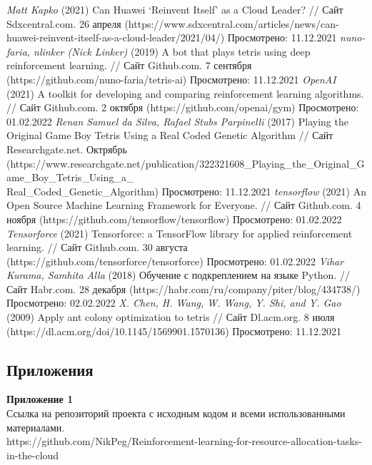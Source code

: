 \documentclass{article}
\newcommand\zz[1]{\par{\normalsize\strut #1} \hfill\ignorespaces}
\begin{document}
\begin{center}
\begin{thebibliography}{}
    \textit{Matt Kapko} (2021) Can Huawei ‘Reinvent Itself’ as a Cloud Leader? // Сайт Sdxcentral.com. 26 апреля (https://www.sdxcentral.com/articles/news/can-huawei-reinvent-itself-as-a-cloud-leader/2021/04/) Просмотрено: 11.12.2021
 \textit{nuno-faria, nlinker (Nick Linker)} (2019) A bot that plays tetris using deep reinforcement learning. // Сайт Github.com. 7 сентября (https://github.com/nuno-faria/tetris-ai) Просмотрено: 11.12.2021
 \textit{OpenAI} (2021) A toolkit for developing and comparing reinforcement learning algorithms. // Сайт Github.com. 2 октября (https://github.com/openai/gym) Просмотрено: 01.02.2022
 \textit{Renan Samuel da Silva, Rafael Stubs Parpinelli} (2017) Playing the Original Game Boy Tetris Using a Real Coded Genetic Algorithm // Сайт Researchgate.net. Октрябрь (https://www.researchgate.net/publication/322321608\_Playing\_the\_Original\_Game\_Boy\_Tetris\_Using\_a\_\\Real\_Coded\_Genetic\_Algorithm) Просмотрено: 11.12.2021
 \textit{tensorflow} (2021) An Open Source Machine Learning Framework for Everyone. // Сайт Github.com. 4 ноября (https://github.com/tensorflow/tensorflow) Просмотрено: 01.02.2022
 \textit{Tensorforce} (2021) Tensorforce: a TensorFlow library for applied reinforcement learning. // Сайт Github.com. 30 августа (https://github.com/tensorforce/tensorforce) Просмотрено: 01.02.2022
 \textit{Vihar Kurama, Samhita Alla} (2018) Обучение с подкреплением на языке Python. // Сайт Habr.com. 28 декабря (https://habr.com/ru/company/piter/blog/434738/) Просмотрено: 02.02.2022
 \textit{X. Chen, H. Wang, W. Wang, Y. Shi, and Y. Gao} (2009) Apply ant colony optimization to tetris // Сайт Dl.acm.org. 8 июля (https://dl.acm.org/doi/10.1145/1569901.1570136) Просмотрено: 11.12.2021
\end{thebibliography}
\end{center}
\newpage
\begin{center}
\section {Приложения}
\end{center}
\zz{}\textbf{Приложение 1\\}
Ссылка на репозиторий проекта с исходным кодом и всеми использованными материалами.\\
https://github.com/NikPeg/Reinforcement-learning-for-resource-allocation-tasks-in-the-cloud
\end{document}
